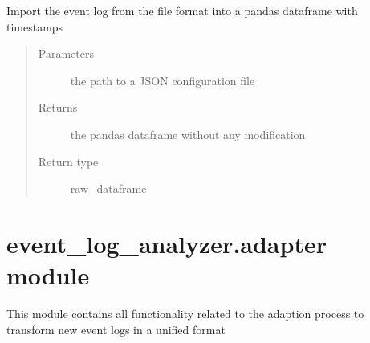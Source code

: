 \documentclass[letterpaper,10pt,english]{sphinxmanual}
\begin{document}
\begin{fulllineitems}
\label{\detokenize{event_log_analyzer:event_log_analyzer.importer.import_xes_file}}
\sphinxAtStartPar
Import the event log from the file format into a pandas dataframe with timestamps
\begin{quote}\begin{description}
\item[{Parameters}] \leavevmode
\sphinxAtStartPar
{} \textendash{} the path to a JSON configuration file

\item[{Returns}] \leavevmode
\sphinxAtStartPar
the pandas dataframe without any modification

\item[{Return type}] \leavevmode
\sphinxAtStartPar
raw\_dataframe

\end{description}\end{quote}

\end{fulllineitems}



\section{event\_log\_analyzer.adapter module}
\label{\detokenize{event_log_analyzer:module-event_log_analyzer.adapter}}\label{\detokenize{event_log_analyzer:event-log-analyzer-adapter-module}}
\sphinxAtStartPar
This module contains all functionality related to the adaption process to transform new event logs in a unified format
\end{document}

